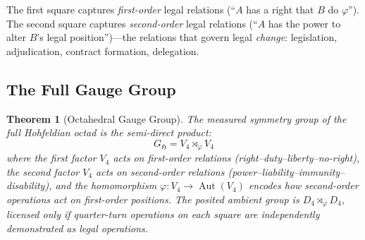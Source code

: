 \documentclass[12pt]{article}
\newtheorem{theorem}{Theorem}[section]
\theoremstyle{definition}
\theoremstyle{remark}
\newcommand{\Ho}{\mathfrak{H}}             %
\begin{document}
The first square captures \emph{first-order} legal relations (``$A$ has a right that $B$ do $\varphi$'').  The second square captures \emph{second-order} legal relations (``$A$ has the power to alter $B$'s legal position'')---the relations that govern legal \emph{change}: legislation, adjudication, contract formation, delegation.

\subsection{The Full Gauge Group}

\begin{theorem}[Octahedral Gauge Group]
\label{thm:gauge_group}
The measured symmetry group of the full Hohfeldian octad is the \emph{semi-direct product}:
\begin{equation}
G_{\Ho} = V_4 \rtimes_\varphi V_4
\label{eq:semidirect}
\end{equation}
where the first factor $V_4$ acts on first-order relations (right--duty--liberty--no-right), the second factor $V_4$ acts on second-order relations (power--liability--immunity--disability), and the homomorphism $\varphi: V_4 \to \operatorname{Aut}(V_4)$ encodes how second-order operations act on first-order positions.  The posited ambient group is $D_4 \rtimes_\varphi D_4$, licensed only if quarter-turn operations on each square are independently demonstrated as legal operations.
\end{theorem}
\end{document}
